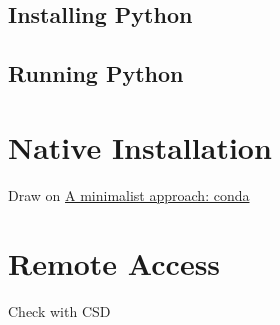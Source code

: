 \documentclass[
]{book}
\begin{document}
\hypertarget{installing-python}{%
\subsection{Installing Python}\label{installing-python}}

\hypertarget{running-python}{%
\subsection{Running Python}\label{running-python}}

\hypertarget{native-installation}{%
\section{Native Installation}\label{native-installation}}

Draw on \href{http://darribas.org/gds19/software.html}{A minimalist approach: conda}

\hypertarget{remote-access}{%
\section{Remote Access}\label{remote-access}}

Check with CSD

  
\end{document}
